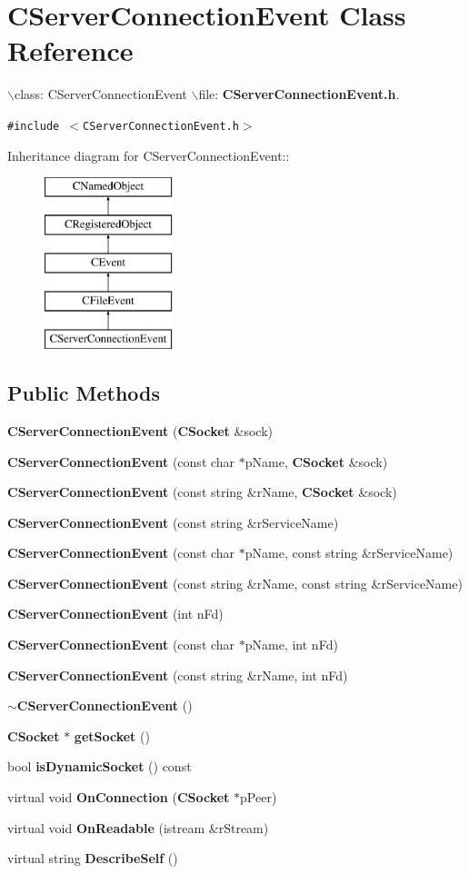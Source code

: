 \section{CServer\-Connection\-Event  Class Reference}
\label{classCServerConnectionEvent}
$\backslash$class: CServer\-Connection\-Event $\backslash$file: {\bf CServer\-Connection\-Event.h}. 


{\tt \#include $<$CServer\-Connection\-Event.h$>$}

Inheritance diagram for CServer\-Connection\-Event::\begin{figure}[H]
\begin{center}
\leavevmode
\includegraphics[height=5cm]{classCServerConnectionEvent}
\end{center}
\end{figure}
\subsection*{Public Methods}
\begin{CompactItemize}
\item 
{\bf CServer\-Connection\-Event} ({\bf CSocket} \&sock)
\item 
{\bf CServer\-Connection\-Event} (const char $\ast$p\-Name, {\bf CSocket} \&sock)
\item 
{\bf CServer\-Connection\-Event} (const string \&r\-Name, {\bf CSocket} \&sock)
\item 
{\bf CServer\-Connection\-Event} (const string \&r\-Service\-Name)
\item 
{\bf CServer\-Connection\-Event} (const char $\ast$p\-Name, const string \&r\-Service\-Name)
\item 
{\bf CServer\-Connection\-Event} (const string \&r\-Name, const string \&r\-Service\-Name)
\item 
{\bf CServer\-Connection\-Event} (int n\-Fd)
\item 
{\bf CServer\-Connection\-Event} (const char $\ast$p\-Name, int n\-Fd)
\item 
{\bf CServer\-Connection\-Event} (const string \&r\-Name, int n\-Fd)
\item 
{\bf $\sim$CServer\-Connection\-Event} ()
\item 
{\bf CSocket} $\ast$ {\bf get\-Socket} ()
\item 
bool {\bf is\-Dynamic\-Socket} () const
\item 
virtual void {\bf On\-Connection} ({\bf CSocket} $\ast$p\-Peer)
\item 
virtual void {\bf On\-Readable} (istream \&r\-Stream)
\item 
virtual string {\bf Describe\-Self} ()
\end{CompactItemize}
